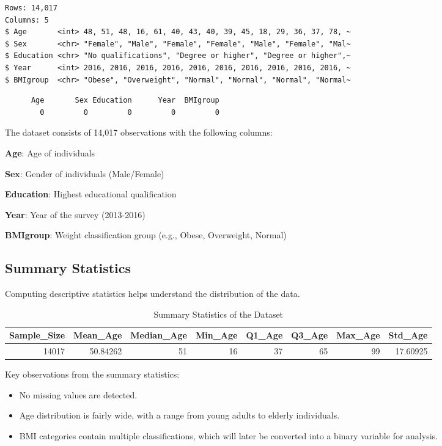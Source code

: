 \documentclass[
  letterpaper,
  DIV=11,
  numbers=noendperiod]{scrartcl}
\begin{document}
\begin{verbatim}
Rows: 14,017
Columns: 5
$ Age       <int> 48, 51, 48, 16, 61, 40, 43, 40, 39, 45, 18, 29, 36, 37, 78, ~
$ Sex       <chr> "Female", "Male", "Female", "Female", "Male", "Female", "Mal~
$ Education <chr> "No qualifications", "Degree or higher", "Degree or higher",~
$ Year      <int> 2016, 2016, 2016, 2016, 2016, 2016, 2016, 2016, 2016, 2016, ~
$ BMIgroup  <chr> "Obese", "Overweight", "Normal", "Normal", "Normal", "Normal~
\end{verbatim}

\begin{verbatim}
      Age       Sex Education      Year  BMIgroup 
        0         0         0         0         0 
\end{verbatim}

The dataset consists of 14,017 observations with the following columns:

\textbf{Age}: Age of individuals

\textbf{Sex}: Gender of individuals (Male/Female)

\textbf{Education}: Highest educational qualification

\textbf{Year}: Year of the survey (2013-2016)

\textbf{BMIgroup}: Weight classification group (e.g., Obese, Overweight,
Normal)

\subsection{Summary Statistics}\label{summary-statistics}

Computing descriptive statistics helps understand the distribution of
the data.

\begin{longtable}[t]{rrrrrrrr}
\caption{Summary Statistics of the Dataset}\\
\toprule
Sample\_Size & Mean\_Age & Median\_Age & Min\_Age & Q1\_Age & Q3\_Age & Max\_Age & Std\_Age\\
\midrule
14017 & 50.84262 & 51 & 16 & 37 & 65 & 99 & 17.60925\\
\bottomrule
\end{longtable}

Key observations from the summary statistics:

\begin{itemize}
\item
  No missing values are detected.
\item
  Age distribution is fairly wide, with a range from young adults to
  elderly individuals.
\item
  BMI categories contain multiple classifications, which will later be
  converted into a binary variable for analysis.
\end{itemize}
\end{document}
